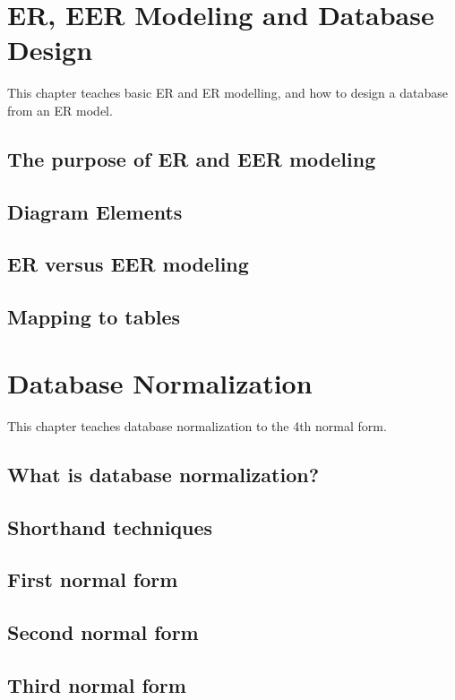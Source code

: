 \chapter{ER, EER Modeling and Database Design}
\label{chap:relational:eer-modeling-and-database-design}
This chapter teaches basic ER and ER modelling, and how to design a database from an ER model.

\section{The purpose of ER and EER modeling}
\section{Diagram Elements}
\section{ER versus EER modeling}
\section{Mapping to tables}

\chapter{Database Normalization}
\label{chap:relational:database-normalization}
This chapter teaches database normalization to the 4th normal form.

\section{What is database normalization?}
\section{Shorthand techniques}
\section{First normal form}
\section{Second normal form}
\section{Third normal form}
